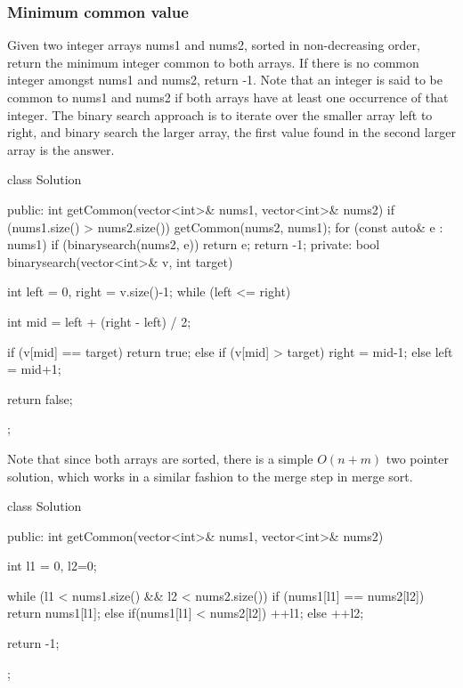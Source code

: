 \documentclass{report}
\begin{document}
   \subsubsection{Minimum common value}
   \bigbreak \noindent 
   Given two integer arrays nums1 and nums2, sorted in non-decreasing order, return the minimum integer common to both arrays. If there is no common integer amongst nums1 and nums2, return -1.
   \bigbreak \noindent 
   Note that an integer is said to be common to nums1 and nums2 if both arrays have at least one occurrence of that integer.
   \bigbreak \noindent 
   The binary search approach is to iterate over the smaller array left to right, and binary search the larger array, the first value found in the second larger array is the answer.
   \bigbreak \noindent 
   \begin{cppcode}
       class Solution {
       public:
           int getCommon(vector<int>& nums1, vector<int>& nums2) {
               if (nums1.size() > nums2.size()) {
                   getCommon(nums2, nums1);
               }
               for (const auto& e : nums1) {
                   if (binarysearch(nums2, e)) return e;
               }
               return -1;
           }
       private:
           bool binarysearch(vector<int>& v, int target) {
               int left = 0, right = v.size()-1;
               while (left <= right) {
                   int mid = left + (right - left) / 2;

                   if (v[mid] == target) return true;
                   else if (v[mid] > target) {
                       right = mid-1;
                   } else {
                       left = mid+1;
                   }
               }
               return false;
           }
       };
   \end{cppcode}
   \bigbreak \noindent 
   Note that since both arrays are sorted, there is a simple $O(n+m)$ two pointer solution, which works in a similar fashion to the merge step in merge sort.
   \bigbreak \noindent 
   \begin{cppcode}
       class Solution {
           public:
           int getCommon(vector<int>& nums1, vector<int>& nums2) {
               int l1 = 0, l2=0;

               while (l1 < nums1.size() && l2 < nums2.size()) {
                   if (nums1[l1] == nums2[l2]) return nums1[l1];
                   else if(nums1[l1] < nums2[l2]) ++l1;
                   else ++l2;
               }

               return -1;
           }
       };
   \end{cppcode}
\end{document}
